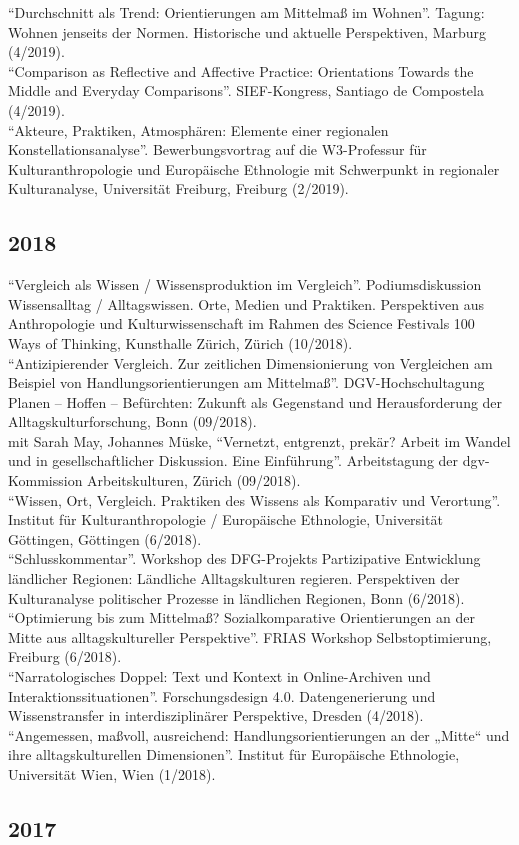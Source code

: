 \enquote{Durchschnitt als Trend: Orientierungen am Mittelmaß im Wohnen}. Tagung: Wohnen jenseits der Normen. Historische und aktuelle Perspektiven, Marburg (4/2019).\\[.25cm]\enquote{Comparison as Reflective and Affective Practice: Orientations Towards the Middle and Everyday Comparisons}. SIEF-Kongress, Santiago de Compostela (4/2019).\\[.25cm]\enquote{Akteure, Praktiken, Atmosphären: Elemente einer regionalen Konstellationsanalyse}. Bewerbungsvortrag auf die W3-Professur für Kulturanthropologie und Europäische Ethnologie mit Schwerpunkt in regionaler Kulturanalyse, Universität Freiburg, Freiburg (2/2019).\subsection*{2018}
\enquote{Vergleich als Wissen / Wissensproduktion im Vergleich}. Podiumsdiskussion Wissensalltag / Alltagswissen. Orte, Medien und Praktiken. Perspektiven aus Anthropologie und Kulturwissenschaft im Rahmen des Science Festivals 100 Ways of Thinking, Kunsthalle Zürich, Zürich (10/2018).\\[.25cm]\enquote{Antizipierender Vergleich. Zur zeitlichen Dimensionierung von Vergleichen am Beispiel von Handlungsorientierungen am Mittelmaß}. DGV-Hochschultagung Planen – Hoffen – Befürchten: Zukunft als Gegenstand und Herausforderung der Alltagskulturforschung, Bonn (09/2018).\\[.25cm]mit Sarah May, Johannes Müske, \enquote{Vernetzt, entgrenzt, prekär? Arbeit im Wandel und in gesellschaftlicher Diskussion. Eine Einführung}. Arbeitstagung der dgv-Kommission Arbeitskulturen, Zürich (09/2018).\\[.25cm]\enquote{Wissen, Ort, Vergleich. Praktiken des Wissens als Komparativ und Verortung}. Institut für Kulturanthropologie / Europäische Ethnologie, Universität Göttingen, Göttingen (6/2018).\\[.25cm]\enquote{Schlusskommentar}. Workshop des DFG-Projekts Partizipative Entwicklung ländlicher Regionen: Ländliche Alltagskulturen regieren. Perspektiven der Kulturanalyse politischer Prozesse in ländlichen Regionen, Bonn (6/2018).\\[.25cm]\enquote{Optimierung bis zum Mittelmaß? Sozialkomparative Orientierungen an der Mitte aus alltagskultureller Perspektive}. FRIAS Workshop Selbstoptimierung, Freiburg (6/2018).\\[.25cm]\enquote{Narratologisches Doppel: Text und Kontext in Online-Archiven und Interaktionssituationen}. Forschungsdesign 4.0. Datengenerierung und Wissenstransfer in interdisziplinärer Perspektive, Dresden (4/2018).\\[.25cm]\enquote{Angemessen, maßvoll, ausreichend: Handlungsorientierungen an der „Mitte“ und ihre alltagskulturellen Dimensionen}. Institut für Europäische Ethnologie, Universität Wien, Wien (1/2018).\subsection*{2017}
